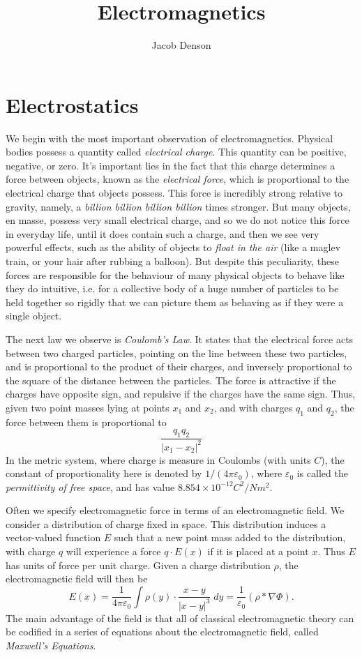 

\title{Electromagnetics}
\author{Jacob Denson}



\chapter{Electrostatics}

We begin with the most important observation of electromagnetics. Physical bodies possess a quantity called \emph{electrical charge}. This quantity can be positive, negative, or zero. It's important lies in the fact that this charge determines a force between objects, known as the \emph{electrical force}, which is proportional to the electrical charge that objects possess. This force is incredibly strong relative to gravity, namely, a \emph{billion billion billion billion} times stronger. But many objects, en masse, possess very small electrical charge, and so we do not notice this force in everyday life, until it does contain such a charge, and then we see very powerful effects, such as the ability of objects to \emph{float in the air} (like a maglev train, or your hair after rubbing a balloon). But despite this peculiarity, these forces are responsible for the behaviour of many physical objects to behave like they do intuitive, i.e. for a collective body of a huge number of particles to be held together so rigidly that we can picture them as behaving as if they were a single object.

The next law we observe is \emph{Coulomb's Law}. It states that the electrical force acts between two charged particles, pointing on the line between these two particles, and is proportional to the product of their charges, and inversely proportional to the square of the distance between the particles. The force is attractive if the charges have opposite sign, and repulsive if the charges have the same sign. Thus, given two point masses lying at points $x_1$ and $x_2$, and with charges $q_1$ and $q_2$, the force between them is proportional to
%
\[ \frac{q_1 q_2}{|x_1 - x_2|^2} \]
%
In the metric system, where charge is measure in Coulombs (with units $C$), the constant of proportionality here is denoted by $1/(4 \pi \varepsilon_0)$, where $\varepsilon_0$ is called the \emph{permittivity of free space}, and has value $8.854 \times 10^{-12} C^2 / N m^2$.

Often we specify electromagnetic force in terms of an electromagnetic field. We consider a distribution of charge fixed in space. This distribution induces a vector-valued function $E$ such that a new point mass added to the distribution, with charge $q$ will experience a force $q \cdot E(x)$ if it is placed at a point $x$. Thus $E$ has units of force per unit charge. Given a charge distribution $\rho$, the electromagnetic field will then be
%
\[ E(x) = \frac{1}{4 \pi \varepsilon_0} \int \rho(y) \cdot \frac{x - y}{|x - y|^3}\; dy = \frac{1}{\varepsilon_0} (\rho * \nabla \Phi). \]
%
The main advantage of the field is that all of classical electromagnetic theory can be codified in a series of equations about the electromagnetic field, called \emph{Maxwell's Equations}.

